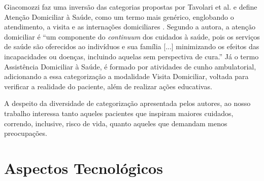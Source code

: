 Giacomozzi faz uma inversão das categorias propostas por Tavolari et al. e 
define Atenção Domiciliar à Saúde, como um termo mais genérico, englobando
o atendimento, a visita e as internações domiciliares \cite{giacomozzi2006pratica}.
Segundo a autora, a atenção domiciliar é ``um
componente do \textit{continuum} dos cuidados à saúde, pois os serviços de
saúde são oferecidos ao indivíduos e sua família [...] minimizando os efeitos
das incapacidades ou doenças, incluindo aquelas sem perspectiva de cura.''
Já o termo Assistência Domiciliar à Saúde, é formado por atividades de cunho 
ambulatorial, adicionando a essa categorização a modalidade Visita Domiciliar,
voltada para verificar a realidade do paciente, além de realizar ações educativas.  

A despeito da diversidade de categorização apresentada pelos autores, ao nosso
trabalho interessa tanto aqueles pacientes que inspiram maiores cuidados,
correndo, inclusive, risco de vida, quanto aqueles que demandam menos
preocupações.



\section{Aspectos Tecnológicos}\label{sec:aspectos-tecnologicos}
